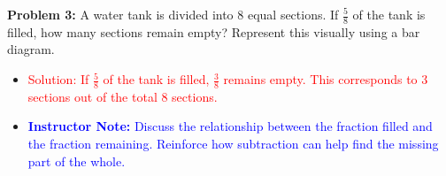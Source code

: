 \documentclass[12pt]{article}
\begin{document}
\begin{tcolorbox}[colframe=black!60, colback=white, 
coltitle=black, colbacktitle=black!15, fonttitle=\bfseries\Large, 
title=Independent Practice, halign title=center, left=10pt, right=10pt, top=10pt, bottom=15pt]
\vspace{1em}

\textbf{Problem 3:} A water tank is divided into 8 equal sections. If \( \frac{5}{8} \) of the tank is filled, how many sections remain empty? Represent this visually using a bar diagram.
\begin{center}
\end{center}

\begin{itemize}
    \item \textcolor{red}{Solution: If \( \frac{5}{8} \) of the tank is filled, \( \frac{3}{8} \) remains empty. This corresponds to 3 sections out of the total 8 sections.}
    \item \textcolor{blue}{\textbf{Instructor Note:} Discuss the relationship between the fraction filled and the fraction remaining. Reinforce how subtraction can help find the missing part of the whole.}
\end{itemize}

\end{tcolorbox}
\end{document}

